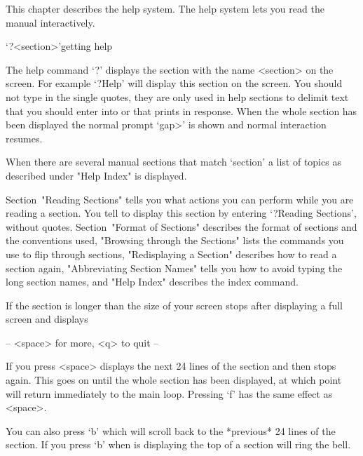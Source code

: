 %
%
%
%

This chapter describes the {\GAP} help system.
The help system lets you read the manual interactively.


\>`?<section>'{getting help}

The help command `?' displays the section with the name <section> on the
screen. For example `?Help' will display this section on the screen.
You should not type in the single quotes, they are only used in help
sections to delimit text that you should enter into {\GAP} or that {\GAP}
prints in response. When the whole section has been displayed the normal
{\GAP} prompt `gap>' is shown and normal {\GAP} interaction resumes.

When there are several manual sections that match `section' a list of topics
as described under "Help Index" is displayed.

Section~"Reading Sections" tells you what actions you can perform
while you are reading a section. You tell {\GAP} to display this
section by entering `?Reading Sections', without quotes.
Section~"Format of Sections" describes the format of sections and the
conventions used,
"Browsing through the Sections" lists the commands you use to flip
through sections, "Redisplaying a Section" describes how to read a
section again, "Abbreviating Section Names" tells you how to avoid typing
the long section names, and "Help Index" describes the index command.


If the section is longer than the size of your screen {\GAP} stops after
displaying a full screen and displays

\begintt
-- <space> for more, <q> to quit --
\endtt

If you press <space> {\GAP} displays the next 24 lines of the section and
then stops again. This goes on until the whole section has been
displayed, at which point {\GAP} will return immediately to the main
{\GAP} loop. Pressing `f' has the same effect as <space>.

You can also press `b' which will scroll back to
the *previous* 24 lines of the section. If you press `b' when
{\GAP} is displaying the top of a section {\GAP} will ring the bell.


